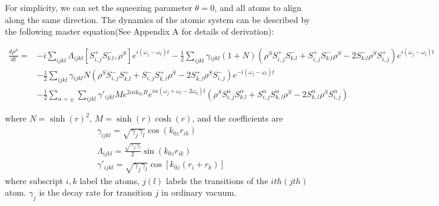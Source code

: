 \documentclass[aps,showpacs,twocolumn,twoside,groupedaddress]{revtex4}
\begin{document}
For simplicity, we can set the squeezing parameter $\theta=0$, and all atoms to align along the same direction. The dynamics of the atomic system can be described by the following master equation(See Appendix A for details of derivation):
\begin{widetext}
\begin{equation}
\label{eq1}
\begin{split}
\frac{d\rho^{S}}{dt}=&-i\underset{ijkl}{\sum}\Lambda_{ijkl}[S_{i,j}^{+}S_{k.l}^{-},\rho^{S}]e^{i(\omega_{j}-\omega_{l})t}-\frac{1}{2}\underset{ijkl}{\sum}\gamma{}_{ijkl}(1+N)(\rho^{S}S_{i,j}^{+}S_{k.l}^{-}+S_{i,j}^{+}S_{k.l}^{-}\rho^{S}-2S_{k.l}^{-}\rho^{S}S_{i,j}^{+})e^{i(\omega_{j}-\omega_{l})t}\\
&-\frac{1}{2}\underset{ijkl}{\sum}\gamma{}_{ijkl}N(\rho^{S}S_{i,j}^{-}S_{k.l}^{+}+S_{i,j}^{-}S_{k,l}^{+}\rho^{S}-2S_{k,l}^{+}\rho^{S}S_{i,j}^{-})e^{-i(\omega_{j}-\omega_{l})t}\\
&-\frac{1}{2}\sum_{\alpha=\pm}\underset{ijkl}{\sum}\gamma'_{ijkl}Me^{2\alpha ik_{0z}R}e^{i\alpha(\omega_{j}+\omega_{l}-2\omega_{0})t}(\rho^{S}S_{i,j}^{\alpha}S_{k.l}^{\alpha}+S_{i,j}^{\alpha}S_{k,l}^{\alpha}\rho^{S}-2S_{k,l}^{\alpha}\rho^{S}S_{i,j}^{\alpha})
\end{split}
\end{equation}
\end{widetext}
where $N=\sinh(r)^2$, $M=\sinh(r)\cosh(r)$, and the coefficients are
\begin{equation}
\label{eq2}
\begin{split}
& \gamma_{ijkl}=\sqrt{\gamma_{j}\gamma_{l}}\cos(k_{0z}r_{ik}) \\
& \Lambda_{ijkl}=\frac{\sqrt{\gamma_{j}\gamma_{l}}}{2}\sin(k_{0z}r_{ik})\\
& \gamma'_{ijkl}=\sqrt{\gamma_{j}\gamma_{l}}\cos[k_{0z}(r_{i}+r_{k})]
\end{split}
\end{equation}
where subscript $i,k$ label the atoms, $j(l)$ labels the transitions of the $ith(jth)$ atom. $\gamma_{j}$ is the decay rate for transition $j$ in ordinary vacuum.
\end{document}
